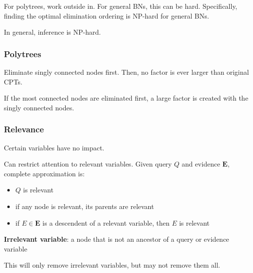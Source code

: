 \documentclass[11pt]{article}
\begin{document}
For polytrees, work outside in.
For general BNs, this can be hard.
Specifically, finding the optimal elimination ordering is NP-hard for general BNs.

In general, inference is NP-hard.
\subsubsection{Polytrees}
\label{sec:orgcac71c2}
Eliminate singly connected nodes first.
Then, no factor is ever larger than original CPTs.

If the most connected nodes are eliminated first, a large factor is created with the singly
connected nodes.
\subsubsection{Relevance}
\label{sec:org12af64b}
Certain variables have no impact.

Can restrict attention to relevant variables.
Given query \(Q\) and evidence \(\mathbf{E}\), complete approximation is:
\begin{itemize}
\item \(Q\) is relevant
\item if any node is relevant, its parents are relevant
\item if \(E \in \mathbf{E}\) is a descendent of a relevant variable, then \(E\) is relevant
\end{itemize}

\textbf{Irrelevant variable}: a node that is not an ancestor of a query or evidence variable

This will only remove irrelevant variables, but may not remove them all.
\end{document}
